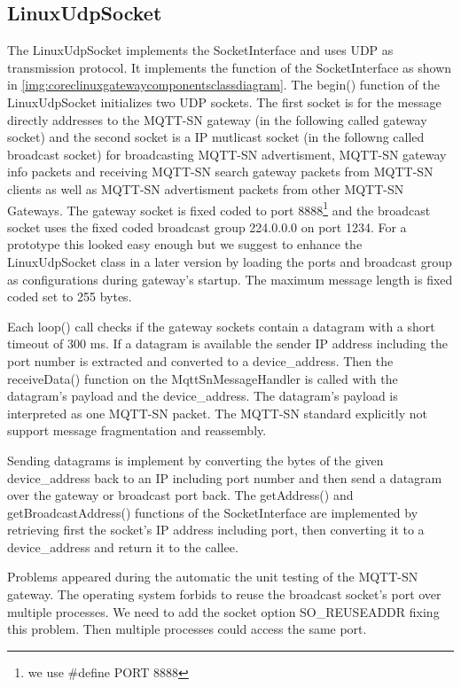 \subsection{LinuxUdpSocket}\label{sec:linuxudpsocket}
The LinuxUdpSocket implements the SocketInterface and uses UDP as transmission protocol.
It implements the function of the SocketInterface as shown in \autoref{img:coreclinuxgatewaycomponentsclassdiagram}.
The begin() function of the LinuxUdpSocket initializes two UDP sockets.
The first socket is for the message directly addresses to the MQTT-SN gateway (in the following called gateway socket) and the second socket is a IP mutlicast socket (in the followng called broadcast socket) for broadcasting MQTT-SN advertisment, MQTT-SN gateway info packets and receiving MQTT-SN search gateway packets from MQTT-SN clients as well as MQTT-SN advertisment packets from other MQTT-SN Gateways.
The gateway socket is fixed coded to port 8888\footnote{we use \#define PORT 8888} and the broadcast socket uses the fixed coded broadcast group 224.0.0.0 on port 1234.
For a prototype this looked easy enough but we suggest to enhance the LinuxUdpSocket class in a later version by loading the ports and broadcast group as configurations during gateway's startup.
The maximum message length is fixed coded set to 255 bytes.

Each loop() call checks if the gateway sockets contain a datagram with a short timeout of 300 ms.
If a datagram is available the sender IP address including the port number is extracted and converted to a device\_address.
Then the receiveData() function on the MqttSnMessageHandler is called with the datagram's payload and the device\_address. The datagram's payload is interpreted as one MQTT-SN packet. The MQTT-SN standard explicitly not support message fragmentation and reassembly.

Sending datagrams is implement by converting the bytes of the given device\_address back to an IP including port number and then send a datagram over the gateway or broadcast port back.
The getAddress() and getBroadcastAddress() functions of the SocketInterface are implemented by retrieving first the socket's IP address including port, then converting it to a device\_address and return it to the callee.

Problems appeared during the automatic the unit testing of the MQTT-SN gateway.
The operating system forbids to reuse the broadcast socket's port over multiple processes.
We need to add the socket option SO\_REUSEADDR fixing this problem.
Then multiple processes could access the same port.
